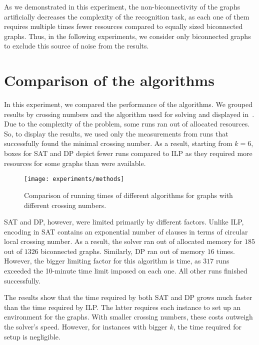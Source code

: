 As we demonstrated in this experiment, the non-biconnectivity of the graphs artificially decreases the complexity of the recognition task, as each one of them requires multiple times fewer resources compared to equally sized biconnected graphs. Thus, in the following experiments, we consider only biconnected graphs to exclude this source of noise from the results.


\section{Comparison of the algorithms}

In this experiment, we compared the performance of the algorithms. We grouped results by crossing numbers and the algorithm used for solving and displayed in~. Due to the complexity of the problem, some runs ran out of allocated resources. So, to display the results, we used only the measurements from runs that successfully found the minimal crossing number. As a result, starting from \(k = 6\), boxes for \textsf{SAT} and \textsf{DP} depict fewer runs compared to \textsf{ILP} as they required more resources for some graphs than were available.

\begin{figure}[tbh]
    \centering
    \texttt{[image: experiments/methods]}
    \caption{Comparison of running times of different algorithms for graphs with different crossing numbers.}
    \label{fig:methods}
\end{figure}

\textsf{SAT} and \textsf{DP}, however, were limited primarily by different factors. Unlike \textsf{ILP}, encoding in \textsf{SAT} contains an exponential number of clauses in terms of circular local crossing number. As a result, the solver ran out of allocated memory for \(185\) out of \(1326\) biconnected graphs. Similarly, \textsf{DP} ran out of memory \(16\) times. However, the bigger limiting factor for this algorithm is time, as \(317\) runs exceeded the 10-minute time limit imposed on each one. All other runs finished successfully.

The results show that the time required by both \textsf{SAT} and \textsf{DP} grows much faster than the time required by \textsf{ILP}. The latter requires each instance to set up an environment for the graphs. With smaller crossing numbers, these costs outweigh the solver's speed. However, for instances with bigger \(k\), the time required for setup is negligible.

